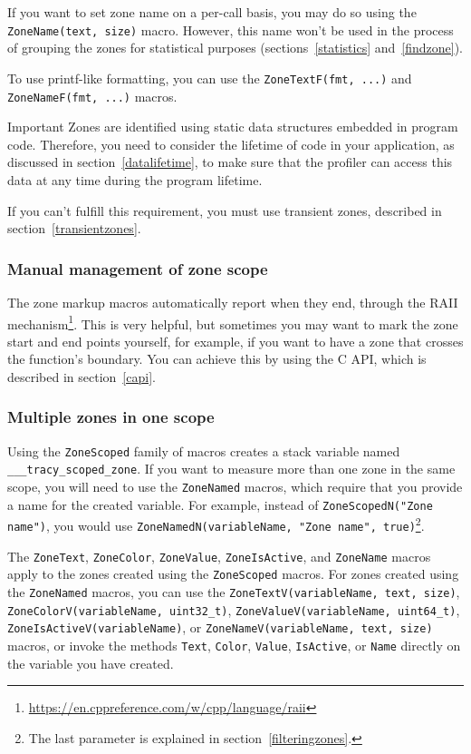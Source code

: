 \documentclass[hidelinks,titlepage,a4paper,twoside]{article}
\begin{document}
If you want to set zone name on a per-call basis, you may do so using the \texttt{ZoneName(text, size)} macro. However, this name won't be used in the process of grouping the zones for statistical purposes (sections~\ref{statistics} and~\ref{findzone}).

To use printf-like formatting, you can use the \texttt{ZoneTextF(fmt, ...)} and \texttt{ZoneNameF(fmt, ...)} macros.

\begin{bclogo}[
noborder=true,
couleur=black!5,
logo=\bcbombe
]{Important}
Zones are identified using static data structures embedded in program code. Therefore, you need to consider the lifetime of code in your application, as discussed in section~\ref{datalifetime}, to make sure that the profiler can access this data at any time during the program lifetime.

If you can't fulfill this requirement, you must use transient zones, described in section~\ref{transientzones}.
\end{bclogo}

\subsubsection{Manual management of zone scope}

The zone markup macros automatically report when they end, through the RAII mechanism\footnote{\url{https://en.cppreference.com/w/cpp/language/raii}}. This is very helpful, but sometimes you may want to mark the zone start and end points yourself, for example, if you want to have a zone that crosses the function's boundary. You can achieve this by using the C API, which is described in section~\ref{capi}.

\subsubsection{Multiple zones in one scope}
\label{multizone}

Using the \texttt{ZoneScoped} family of macros creates a stack variable named \texttt{\_\_\_tracy\_scoped\_zone}. If you want to measure more than one zone in the same scope, you will need to use the \texttt{ZoneNamed} macros, which require that you provide a name for the created variable. For example, instead of \texttt{ZoneScopedN("Zone name")}, you would use \texttt{ZoneNamedN(variableName, "Zone name", true)}\footnote{The last parameter is explained in section~\ref{filteringzones}.}.

The \texttt{ZoneText}, \texttt{ZoneColor}, \texttt{ZoneValue}, \texttt{ZoneIsActive}, and \texttt{ZoneName} macros apply to the zones created using the \texttt{ZoneScoped} macros. For zones created using the \texttt{ZoneNamed} macros, you can use the \texttt{ZoneTextV(variableName, text, size)}, \texttt{ZoneColorV(variableName, uint32\_t)}, \texttt{ZoneValueV(variableName, uint64\_t)}, \texttt{ZoneIsActiveV(variableName)}, or \texttt{ZoneNameV(variableName, text, size)} macros, or invoke the methods \texttt{Text}, \texttt{Color}, \texttt{Value}, \texttt{IsActive}, or \texttt{Name} directly on the variable you have created.
\end{document}
